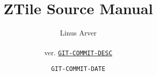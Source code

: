 \documentclass[letterpaper,twoside,12pt]{report}
\begin{document}
\title{ZTile Source Manual}
\author{Linus Arver\\
\\
ver. \href{http://www.github.com/listx/ztile/commit/GIT-COMMIT-HASH}{\texttt{GIT-COMMIT-DESC}}
}
\date{\texttt{GIT-COMMIT-DATE}}
\maketitle{}
\tableofcontents{}





\end{document}
